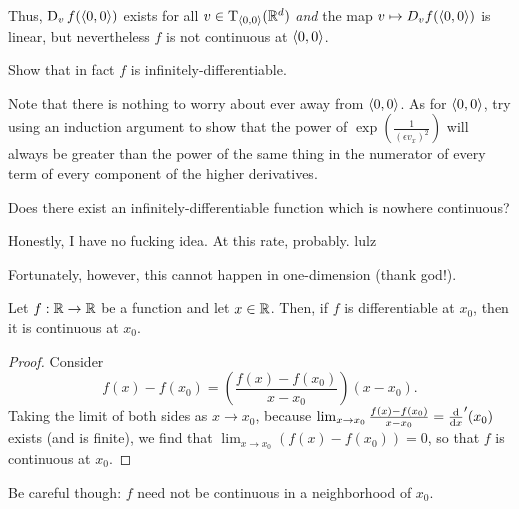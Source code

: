 \begin{exm}
Thus, $\D _vf(\coord{0,0})$ exists for all $v\in \tangent{\R ^d}{\coord{0,0}}$ \emph{and} the map $v\mapsto D _vf(\coord{0,0})$ is linear, but nevertheless $f$ is not continuous at $\coord{0,0}$.

\begin{exr}
Show that in fact $f$ is infinitely-differentiable.
\begin{rmk}
Note that there is nothing to worry about ever away from $\coord{0,0}$.  As for $\coord{0,0}$, try using an induction argument to show that the power of $\exp \left( \tfrac{1}{(\epsilon v_x)^2}\right)$ will always be greater than the power of the same thing in the numerator of every term of every component of the higher derivatives.
\end{rmk}
\end{exr}
\end{exm}
\begin{exr}
Does there exist an infinitely-differentiable function which is nowhere continuous?
\begin{rmk}
Honestly, I have no fucking idea.  At this rate, probably.  lulz
\end{rmk}
\end{exr}
Fortunately, however, this cannot happen in one-dimension (thank god!).
\begin{prp}\label{prp6.5.1}
Let $f:\R \rightarrow \R$ be a function and let $x\in \R$.  Then, if $f$ is differentiable at $x_0$, then it is continuous at $x_0$.
\begin{proof}
Consider
\begin{equation}
f(x)-f(x_0)=\left( \frac{f(x)-f(x_0)}{x-x_0}\right) (x-x_0).
\end{equation}
Taking the limit of both sides as $x\to x_0$, because $\lim _{x\to x_0}\frac{f(x)-f(x_0)}{x-x_0}=\frac{\dif}{\dif x}'(x_0)$ exists (and is finite), we find that $\lim _{x\to x_0}(f(x)-f(x_0))=0$, so that $f$ is continuous at $x_0$.
\end{proof}
\end{prp}
Be careful though:  $f$ need not be continuous in a neighborhood of $x_0$.
